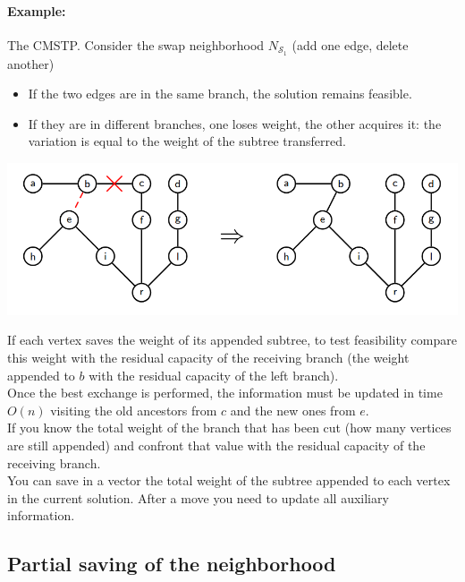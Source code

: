 \paragraph{Example:} The CMSTP. Consider the swap neighborhood $N_{\mathcal{S}_1}$ (add one edge, delete another)
\begin{itemize}
	\item If the two edges are in the same branch, the solution remains feasible.\\
	
	\item If they are in different branches, one loses weight, the other acquires it: the variation is equal to the weight of the subtree transferred.\\
\end{itemize}

\begin{center}
	\includegraphics[width=0.8\columnwidth]{img/CMST3}
\end{center}

If each vertex saves the weight of its appended subtree, to test feasibility compare this weight with the residual capacity of the receiving branch (the weight appended to $b$ with the residual capacity of the left branch).\\

Once the best exchange is performed, the information must be updated in time $O (n)$ visiting the old ancestors from $c$ and the new ones from $e$.\\

If you know the total weight of the branch that has been cut (how many vertices are still appended) and confront that value with the residual capacity of the receiving branch.\\

You can save in a vector the total weight of the subtree appended to each vertex in the current solution. After a move you need to update all auxiliary information.\\

\newpage

\subsection{Partial saving of the neighborhood}

